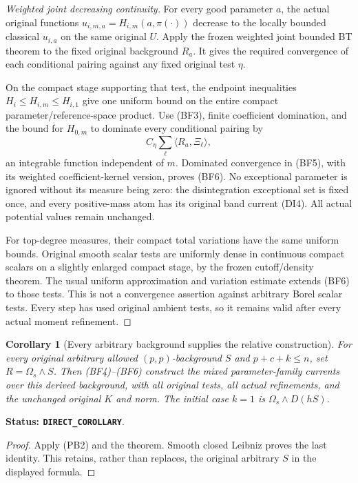 \documentclass[11pt,a4paper]{article}
\numberwithin{equation}{section}
\newtheorem{corollary}[theorem]{Corollary}
\theoremstyle{definition}
\theoremstyle{remark}
\begin{document}
\begin{proof}[Weighted joint decreasing continuity]
For every good parameter $a$, the actual original functions
$u_{i,m,a}=H_{i,m}(a,\pi(\cdot))$ decrease to the locally bounded
classical $u_{i,a}$ on the same original $U$. Apply the frozen
weighted joint bounded BT theorem to the fixed original background
$R_a$. It gives the required convergence of each conditional
pairing against any fixed original test $\eta$.

On the compact stage supporting that test, the endpoint inequalities
$H_i\le H_{i,m}\le H_{i,1}$ give one uniform bound on the entire
compact parameter/reference-space product. Use (BF3), finite
coefficient domination, and the bound for $H_{0,m}$ to dominate
every conditional pairing by
\[
                         C_\eta\sum_\ell\langle R_a,\Xi_\ell\rangle,
 \tag{BF9}
\]
an integrable function independent of $m$. Dominated convergence
in (BF5), with its weighted coefficient-kernel version, proves
(BF6). No exceptional parameter is ignored without its measure
being zero: the disintegration exceptional set is fixed once,
and every positive-mass atom has its original band current (DI4).
All actual potential values remain unchanged.

For top-degree measures, their compact total variations have the
same uniform bounds. Original smooth scalar tests are uniformly
dense in continuous compact scalars on a slightly enlarged compact
stage, by the frozen cutoff/density theorem. The usual uniform
approximation and variation estimate extends (BF6) to those tests.
This is not a convergence assertion against arbitrary Borel scalar
tests. Every step has used original ambient tests, so it remains
valid after every actual moment refinement.
\end{proof}

\begin{corollary}[Every arbitrary background supplies the relative construction]
\label{cor:r12-bounded-Borel-family-arbitrary-S}
For every original arbitrary allowed $(p,p)$-background $S$ and
$p+c+k\le n$, set $R=\Omega_s\wedge S$. Then (BF4)--(BF6)
construct the mixed parameter-family currents over this derived
background, with all original tests, all actual refinements, and
the unchanged original $K$ and norm. The initial case $k=1$ is
$\Omega_s\wedge D(hS)$.
\end{corollary}

\noindent\textbf{Status: \texttt{DIRECT\_COROLLARY}}.

\begin{proof}
Apply (PB2) and the theorem. Smooth closed Leibniz proves the last
identity. This retains, rather than replaces, the original arbitrary
$S$ in the displayed formula.
\end{proof}
\end{document}
